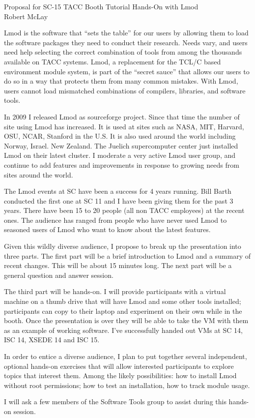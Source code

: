 \documentclass[12pt]{article}
\begin{document}
\begin{center}
Proposal for SC-15 TACC Booth Tutorial Hands-On with Lmod \\
Robert McLay
\end{center}

Lmod is the software that ``sets the table'' for our users by allowing
them to load the software packages they need to conduct their
research.  Needs vary, and users need help selecting the correct
combination of tools from among the thousands available on TACC
systems.  Lmod, a replacement for the TCL/C based environment module
system, is part of the ``secret sauce'' that allows our users to do so
in a way that protects them from many common mistakes.  With Lmod,
users cannot load mismatched combinations of compilers, libraries, and
software tools.
 
In 2009 I released Lmod as sourceforge project.  Since that time the
number of site using Lmod has increased.  It is used at sites such as
NASA, MIT, Harvard, OSU, NCAR, Stanford in the U.S. It is also used
around the world including Norway, Israel. New Zealand. The Juelich
supercomputer center just installed Lmod on their latest cluster. I
moderate a very active Lmod user group, and continue to add features
and improvements in response to growing needs from sites around the
world. 

The Lmod events at SC have been a success for 4 years running.  Bill
Barth conducted the first one at SC 11 and I have been giving them for
the past 3 years.  There have been 15 to 20 people (all non TACC
employees) at the recent ones.  The audience has ranged from people
who have never used Lmod to seasoned users of Lmod who want to know
about the latest features.

Given this wildly diverse audience, I propose to break up the 
presentation into three parts.   The first part will be a brief
introduction to Lmod and a summary of recent changes. This will be
about 15 minutes long.  The next part will be a general question and
answer session.  

The third part will be hands-on.  I will provide participants with a
virtual machine on a thumb drive that will have Lmod and some other
tools installed; participants can copy to their laptop and experiment
on their own while in the booth.  Once the presentation is over they
will be able to take the VM with them as an example of working
software.  I've successfully handed out VMs at SC 14, ISC 14, XSEDE 14
and ISC 15.

In order to entice a diverse audience, I plan to put together several
independent, optional hands-on exercises that will allow interested
participants to explore topics that interest them. Among the likely
possibilities: how to install Lmod without root permissions; how to
test an installation, how to track module usage.

I will ask a few members of the Software Tools group to assist during
this hands-on session.  
\end{document}
